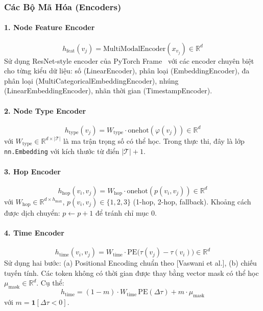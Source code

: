 \documentclass[12pt,a4paper]{article}
\begin{document}
\subsubsection{Các Bộ Mã Hóa (Encoders)}

\paragraph{1. Node Feature Encoder}
\begin{equation}
  h_\text{feat}(v_j) = \text{MultiModalEncoder}(x_{v_j}) \in \mathbb{R}^d
  \label{eq:feat}
\end{equation}
Sử dụng ResNet-style encoder của PyTorch Frame~\cite{pytorch_frame} với các
encoder chuyên biệt cho từng kiểu dữ liệu: số (LinearEncoder), phân loại
(EmbeddingEncoder), đa phân loại (MultiCategoricalEmbeddingEncoder),
nhúng (LinearEmbeddingEncoder), nhãn thời gian (TimestampEncoder).

\paragraph{2. Node Type Encoder}
\begin{equation}
  h_\text{type}(v_j) = W_\text{type} \cdot \text{onehot}(\varphi(v_j)) \in \mathbb{R}^d
  \label{eq:type}
\end{equation}
với $W_\text{type} \in \mathbb{R}^{d \times |\mathcal{T}|}$ là ma trận trọng số có thể học.
Trong thực thi, đây là lớp \texttt{nn.Embedding} với kích thước từ điển $|\mathcal{T}|+1$.

\paragraph{3. Hop Encoder}
\begin{equation}
  h_\text{hop}(v_i, v_j) = W_\text{hop} \cdot \text{onehot}(p(v_i, v_j)) \in \mathbb{R}^d
  \label{eq:hop}
\end{equation}
với $W_\text{hop} \in \mathbb{R}^{d \times h_\text{max}}$, $p(v_i, v_j) \in \{1,2,3\}$ 
(1-hop, 2-hop, fallback). Khoảng cách được dịch chuyển: $p \leftarrow p + 1$ để tránh
chỉ mục 0.

\paragraph{4. Time Encoder}
\begin{equation}
  h_\text{time}(v_i, v_j) = W_\text{time} \cdot \text{PE}\bigl(\tau(v_j) - \tau(v_i)\bigr) \in \mathbb{R}^d
  \label{eq:time}
\end{equation}
Sử dụng hai bước: (a) Positional Encoding chuẩn theo [Vaswani et al.], (b) chiếu tuyến tính.
Các token không có thời gian được thay bằng vector mask có thể học $\mu_\text{mask} \in \mathbb{R}^d$.
Cụ thể:
\[
  h_\text{time} = (1 - m) \cdot W_\text{time}\, \text{PE}(\Delta\tau) + m \cdot \mu_\text{mask}
\]
với $m = \mathbf{1}[\Delta\tau < 0]$.
\end{document}
